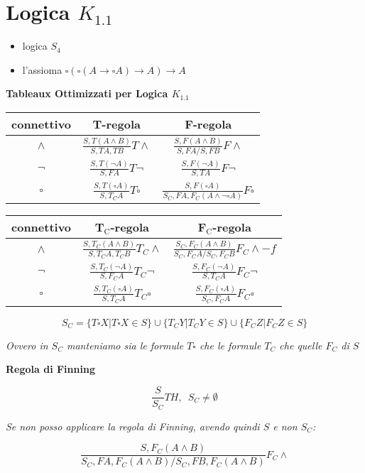 \documentclass[a4paper,12pt, oneside]{book}
\begin{document}
\section*{Logica $K_{1.1}$}
\begin{itemize}
  \item logica $S_4$
  \item l'assioma $\square(\square(A\to\square A)\to A)\to A$
\end{itemize}
\begin{center}
  \textbf{Tableaux Ottimizzati per Logica $K_{1.1}$}
\end{center}
\begin{table}[H]
  \Large
  \centering
  \begin{tabular}{c||c|c}
    connettivo& T-regola& F-regola\\
    \hline
    \hline
    $\land$ & $\frac{S,T(A\land B)}{S,TA,TB}T\land$&
                        $\frac{S,F(A\land B)}{S,FA/S,FB}F\land$\\
    \hline
    $\neg$ & $\frac{S,T(\neg A)}{S,FA}T\neg$&
                        $\frac{S,F(\neg A)}{S,TA}F\neg$\\
    \hline
    $\square$ & $\frac{S,T(\square A)}{S,T_CA}T\square$&
             $\frac{S,F(\square A)}{S_C,FA,F_C(A\land\neg\square A)}F\square$\\
  \end{tabular}
\end{table}
\begin{table}[H]
  \Large
  \centering
  \begin{tabular}{c||c|c}
    connettivo& T$_{\mbox{C}}$-regola&F$_{\mbox{C}}$-regola\\
    \hline
    \hline
    $\land$ & $\frac{S,T_C(A\land B)}{S,T_CA,T_CB}T_C\land$&
              $\frac{S_C,F_C(A\land B)}{S_C,F_CA/S_C,F_CB}F_C\land -f$\\
    \hline
    $\neg$ & $\frac{S,T_C(\neg A)}{S,F_CA}T_C\neg$&
            $\frac{S,F_C(\neg A)}{S,T_CA}F_C\neg$\\
    \hline
    $\square$ & $\frac{S,T_C(\square A)}{S,T_CA}T_C\square$ &
               $\frac{S,F_C(\square A)}{S_C,F_CA}F_C\square$
  \end{tabular}
\end{table}
\[S_C=\{T\square X|T\square X\in S\}\cup\{T_CY|T_CY\in S\}\cup
  \{F_CZ|F_CZ\in S\}\]
\begin{center}
  \textit{Ovvero in $S_C$ manteniamo sia le formule $T\square$ che le formule
    $T_C$ che quelle $F_C$ di $S$}
\end{center}
\begin{center}
  \textbf{Regola di Finning}
\end{center}
\[\frac{S}{S_C}TH,\,\,\,S_C\neq \emptyset\]
\begin{center}
  \textit{Se non posso applicare la regola di Finning, avendo quindi $S$ e non
    $S_C$:} 
\end{center}
\[\frac{S,F_C(A\land B)}{S_C,FA,F_C(A\land B)/S_C,FB,F_C(A\land B)}F_C\land\]
\newpage
\end{document}
